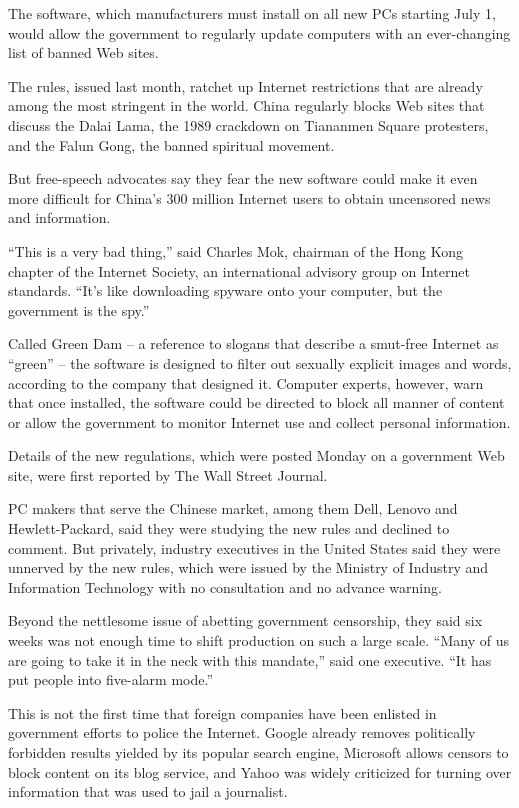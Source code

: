 \documentclass[12pt,a4paper,onecolumn]{article}
\begin{document}
The software, which manufacturers must install on all new PCs starting July 1, would allow the
government to regularly update computers with an ever-changing list of banned Web sites.

The rules, issued last month, ratchet up Internet restrictions that are already among the most
stringent in the world. China regularly blocks Web sites that discuss the Dalai Lama, the 1989
crackdown on Tiananmen Square protesters, and the Falun Gong, the banned spiritual movement.

But free-speech advocates say they fear the new software could make it even more difficult for
China's 300 million Internet users to obtain uncensored news and information.

``This is a very bad thing,'' said Charles Mok, chairman of the Hong Kong chapter of the Internet
Society, an international advisory group on Internet standards. ``It's like downloading spyware onto
your computer, but the government is the spy.''

Called Green Dam -- a reference to slogans that describe a smut-free Internet as ``green'' -- the
software is designed to filter out sexually explicit images and words, according to the company that
designed it. Computer experts, however, warn that once installed, the software could be directed to
block all manner of content or allow the government to monitor Internet use and collect personal
information.

Details of the new regulations, which were posted Monday on a government Web site, were first
reported by The Wall Street Journal.

PC makers that serve the Chinese market, among them Dell, Lenovo and Hewlett-Packard, said they were
studying the new rules and declined to comment. But privately, industry executives in the United
States said they were unnerved by the new rules, which were issued by the Ministry of Industry and
Information Technology with no consultation and no advance warning.

Beyond the nettlesome issue of abetting government censorship, they said six weeks was not enough
time to shift production on such a large scale. ``Many of us are going to take it in the neck with
this mandate,'' said one executive. ``It has put people into five-alarm mode.''

This is not the first time that foreign companies have been enlisted in government efforts to police
the Internet. Google already removes politically forbidden results yielded by its popular search
engine, Microsoft allows censors to block content on its blog service, and Yahoo was widely
criticized for turning over information that was used to jail a journalist.
\end{document}
